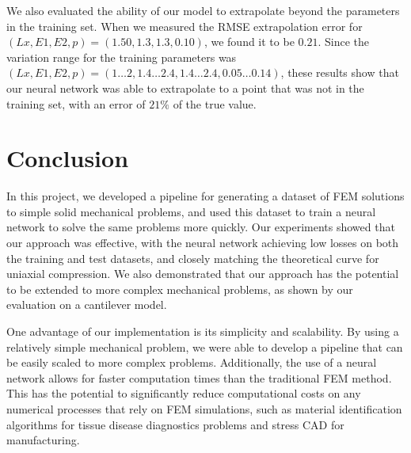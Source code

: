 \documentclass[oneside,a4paper,english,links]{amca}
\begin{document}
We also evaluated the ability of our model to extrapolate beyond the parameters in the training set. When we measured the RMSE extrapolation error for $(Lx, E1, E2, p) = (1.50, 1.3, 1.3, 0.10)$, we found it to be $0.21$. Since the variation range for the training parameters was $(Lx, E1, E2, p) = (1 \hdots 2, 1.4 \hdots 2.4, 1.4 \hdots 2.4, 0.05 \hdots 0.14)$, these results show that our neural network was able to extrapolate to a point that was not in the training set, with an error of $21 \%$ of the true value. 


\section{Conclusion}
In this project, we developed a pipeline for generating a dataset of FEM solutions to simple solid mechanical problems, and used this dataset to train a neural network to solve the same problems more quickly. Our experiments showed that our approach was effective, with the neural network achieving low losses on both the training and test datasets, and closely matching the theoretical curve for uniaxial compression. We also demonstrated that our approach has the potential to be extended to more complex mechanical problems, as shown by our evaluation on a cantilever model. 

One advantage of our implementation is its simplicity and scalability. By using a relatively simple mechanical problem, we were able to develop a pipeline that can be easily scaled to more complex problems. Additionally, the use of a neural network allows for faster computation times than the traditional FEM method. This has the potential to significantly reduce computational costs on any numerical processes that rely on FEM simulations, such as material identification algorithms for tissue disease diagnostics problems and stress CAD for manufacturing.
\end{document}
